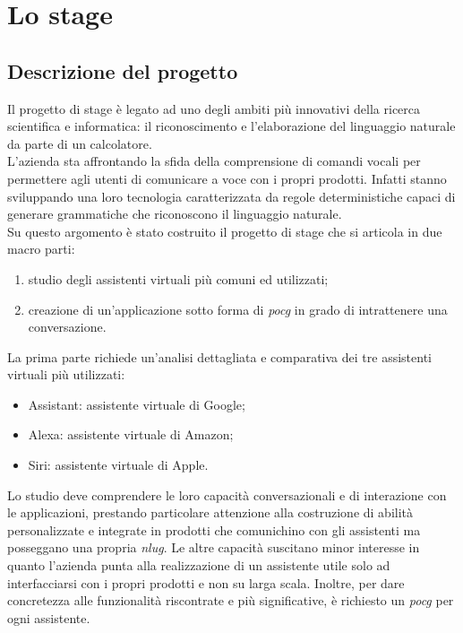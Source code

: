 
\chapter{Lo stage}
\label{cap:lo-stage}


\section{Descrizione del progetto}
Il progetto di stage è legato ad uno degli ambiti più innovativi della ricerca scientifica e informatica: il riconoscimento e l'elaborazione del linguaggio naturale da parte di un calcolatore. \\
L'azienda sta affrontando la sfida della comprensione di comandi vocali per permettere agli utenti di comunicare a voce con i propri prodotti. Infatti stanno sviluppando una loro tecnologia caratterizzata da regole deterministiche capaci di generare grammatiche che riconoscono il linguaggio naturale. \\ Su questo argomento è stato costruito il progetto di stage che si articola in due macro parti:
\begin{enumerate}
	\item studio degli assistenti virtuali più comuni ed utilizzati;
	\item creazione di un'applicazione sotto forma di \emph{\gls{pocg}} in grado di intrattenere una conversazione.
\end{enumerate}
La prima parte richiede un'analisi dettagliata e comparativa dei tre assistenti virtuali più utilizzati:
\begin{itemize}
	\item Assistant: assistente virtuale di Google;
	\item Alexa: assistente virtuale di Amazon;
	\item Siri: assistente virtuale di Apple.
\end{itemize}
Lo studio deve comprendere le loro capacità conversazionali e di interazione con le applicazioni, prestando particolare attenzione alla costruzione di abilità personalizzate e integrate in prodotti che comunichino con gli assistenti ma posseggano una propria \emph{\gls{nlug}}. Le altre capacità suscitano minor interesse in quanto l'azienda punta alla realizzazione di un assistente utile solo ad interfacciarsi con i propri prodotti e non su larga scala. Inoltre, per dare concretezza alle funzionalità riscontrate e più significative, è richiesto un \emph{\gls{pocg}} per ogni assistente.\\
